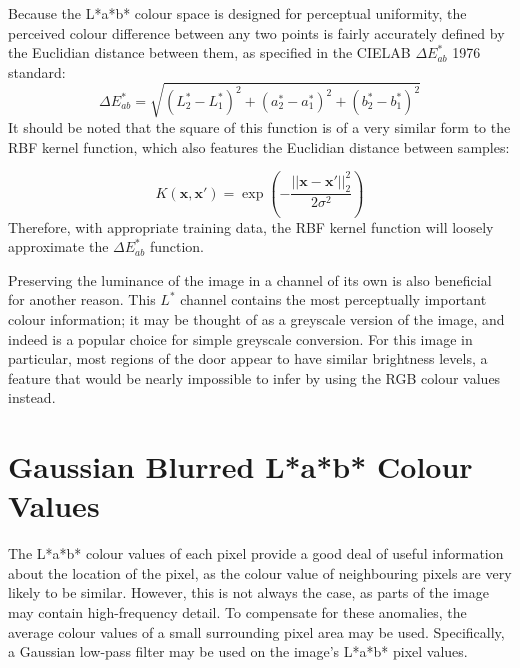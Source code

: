 %                
%                     
%                  


Because the L*a*b* colour space is designed for perceptual uniformity, the perceived colour difference between any two points is fairly accurately defined by the Euclidian distance between them, as specified in the CIELAB $\Delta E_{ab}^*$ 1976 standard:
\begin{equation}
\Delta E_{ab}^* = \sqrt{ (L^*_2-L^*_1)^2+(a^*_2-a^*_1)^2 + (b^*_2-b^*_1)^2 }
\end{equation}
It should be noted that the square of this function is of a very similar form to the RBF kernel function, which also features the Euclidian distance between samples:

\begin{equation}
K(\mathbf{x}, \mathbf{x'}) = \exp\left(-\frac{||\mathbf{x} - \mathbf{x'}||_2^2}{2\sigma^2}\right)
\end{equation}
Therefore, with appropriate training data, the RBF kernel function will loosely approximate the $\Delta E_{ab}^*$ function.

  Preserving the luminance of the image in a channel of its own is also beneficial for another reason. This $L^*$ channel contains the most perceptually important colour information; it may be thought of as a greyscale version of the image, and indeed is a popular choice for simple greyscale conversion. For this image in particular, most regions of the door appear to have similar brightness levels, a feature that would be nearly impossible to infer by using the RGB colour values instead.

\section{Gaussian Blurred L*a*b* Colour Values}
The L*a*b* colour values of each pixel provide a good deal of useful information about the location of the pixel, as the colour value of neighbouring pixels are very likely to be similar.  However, this is not always the case, as parts of the image may contain high-frequency detail.  To compensate for these anomalies, the average colour values of a small surrounding pixel area may be used. Specifically, a Gaussian low-pass filter may be used on the image's L*a*b* pixel values.  

